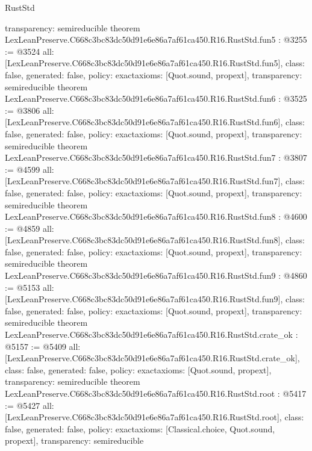 \begin{lexlean}{RustStd}
\begin{coremodule}
{  transparency: semireducible
}
theorem LexLeanPreserve.C668c3bc83dc50d91e6e86a7af61ca450.R16.RustStd.fun5 : @3255 := @3524 {
  all: [LexLeanPreserve.C668c3bc83dc50d91e6e86a7af61ca450.R16.RustStd.fun5],
  class: false,
  generated: false,
  policy: exact{axioms: [Quot.sound, propext]},
  transparency: semireducible
}
theorem LexLeanPreserve.C668c3bc83dc50d91e6e86a7af61ca450.R16.RustStd.fun6 : @3525 := @3806 {
  all: [LexLeanPreserve.C668c3bc83dc50d91e6e86a7af61ca450.R16.RustStd.fun6],
  class: false,
  generated: false,
  policy: exact{axioms: [Quot.sound, propext]},
  transparency: semireducible
}
theorem LexLeanPreserve.C668c3bc83dc50d91e6e86a7af61ca450.R16.RustStd.fun7 : @3807 := @4599 {
  all: [LexLeanPreserve.C668c3bc83dc50d91e6e86a7af61ca450.R16.RustStd.fun7],
  class: false,
  generated: false,
  policy: exact{axioms: [Quot.sound, propext]},
  transparency: semireducible
}
theorem LexLeanPreserve.C668c3bc83dc50d91e6e86a7af61ca450.R16.RustStd.fun8 : @4600 := @4859 {
  all: [LexLeanPreserve.C668c3bc83dc50d91e6e86a7af61ca450.R16.RustStd.fun8],
  class: false,
  generated: false,
  policy: exact{axioms: [Quot.sound, propext]},
  transparency: semireducible
}
theorem LexLeanPreserve.C668c3bc83dc50d91e6e86a7af61ca450.R16.RustStd.fun9 : @4860 := @5153 {
  all: [LexLeanPreserve.C668c3bc83dc50d91e6e86a7af61ca450.R16.RustStd.fun9],
  class: false,
  generated: false,
  policy: exact{axioms: [Quot.sound, propext]},
  transparency: semireducible
}
theorem LexLeanPreserve.C668c3bc83dc50d91e6e86a7af61ca450.R16.RustStd.crate_ok : @5157 := @5409 {
  all: [LexLeanPreserve.C668c3bc83dc50d91e6e86a7af61ca450.R16.RustStd.crate_ok],
  class: false,
  generated: false,
  policy: exact{axioms: [Quot.sound, propext]},
  transparency: semireducible
}
theorem LexLeanPreserve.C668c3bc83dc50d91e6e86a7af61ca450.R16.RustStd.root : @5417 := @5427 {
  all: [LexLeanPreserve.C668c3bc83dc50d91e6e86a7af61ca450.R16.RustStd.root],
  class: false,
  generated: false,
  policy: exact{axioms: [Classical.choice, Quot.sound, propext]},
  transparency: semireducible
}


\end{coremodule}
\end{lexlean}
